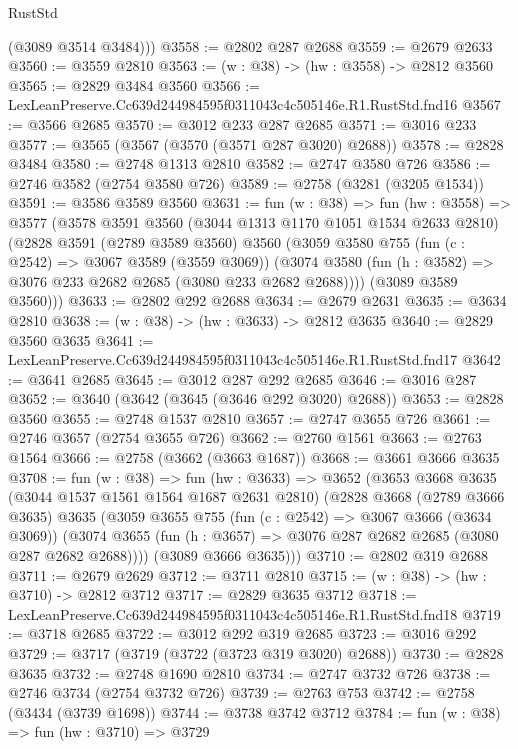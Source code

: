 \begin{lexlean}{RustStd}
\begin{coremodule}
        (@3089 @3514 @3484)))
@3558 := @2802 @287 @2688
@3559 := @2679 @2633
@3560 := @3559 @2810
@3563 := (w : @38) -> (hw : @3558) -> @2812 @3560
@3565 := @2829 @3484 @3560
@3566 := LexLeanPreserve.Cc639d244984595f0311043c4c505146e.R1.RustStd.fnd16
@3567 := @3566 @2685
@3570 := @3012 @233 @287 @2685
@3571 := @3016 @233
@3577 := @3565 (@3567 (@3570 (@3571 @287 @3020) @2688))
@3578 := @2828 @3484
@3580 := @2748 @1313 @2810
@3582 := @2747 @3580 @726
@3586 := @2746 @3582 (@2754 @3580 @726)
@3589 := @2758 (@3281 (@3205 @1534))
@3591 := @3586 @3589 @3560
@3631 := fun (w : @38) =>
  fun (hw : @3558) =>
  @3577
    (@3578
      @3591
      @3560
      (@3044 @1313 @1170 @1051 @1534 @2633 @2810)
      (@2828
        @3591
        (@2789 @3589 @3560)
        @3560
        (@3059
          @3580
          @755
          (fun (c : @2542) => @3067 @3589 (@3559 @3069))
          (@3074 @3580 (fun (h : @3582) => @3076 @233 @2682 @2685 (@3080 @233 @2682 @2688))))
        (@3089 @3589 @3560)))
@3633 := @2802 @292 @2688
@3634 := @2679 @2631
@3635 := @3634 @2810
@3638 := (w : @38) -> (hw : @3633) -> @2812 @3635
@3640 := @2829 @3560 @3635
@3641 := LexLeanPreserve.Cc639d244984595f0311043c4c505146e.R1.RustStd.fnd17
@3642 := @3641 @2685
@3645 := @3012 @287 @292 @2685
@3646 := @3016 @287
@3652 := @3640 (@3642 (@3645 (@3646 @292 @3020) @2688))
@3653 := @2828 @3560
@3655 := @2748 @1537 @2810
@3657 := @2747 @3655 @726
@3661 := @2746 @3657 (@2754 @3655 @726)
@3662 := @2760 @1561
@3663 := @2763 @1564
@3666 := @2758 (@3662 (@3663 @1687))
@3668 := @3661 @3666 @3635
@3708 := fun (w : @38) =>
  fun (hw : @3633) =>
  @3652
    (@3653
      @3668
      @3635
      (@3044 @1537 @1561 @1564 @1687 @2631 @2810)
      (@2828
        @3668
        (@2789 @3666 @3635)
        @3635
        (@3059
          @3655
          @755
          (fun (c : @2542) => @3067 @3666 (@3634 @3069))
          (@3074 @3655 (fun (h : @3657) => @3076 @287 @2682 @2685 (@3080 @287 @2682 @2688))))
        (@3089 @3666 @3635)))
@3710 := @2802 @319 @2688
@3711 := @2679 @2629
@3712 := @3711 @2810
@3715 := (w : @38) -> (hw : @3710) -> @2812 @3712
@3717 := @2829 @3635 @3712
@3718 := LexLeanPreserve.Cc639d244984595f0311043c4c505146e.R1.RustStd.fnd18
@3719 := @3718 @2685
@3722 := @3012 @292 @319 @2685
@3723 := @3016 @292
@3729 := @3717 (@3719 (@3722 (@3723 @319 @3020) @2688))
@3730 := @2828 @3635
@3732 := @2748 @1690 @2810
@3734 := @2747 @3732 @726
@3738 := @2746 @3734 (@2754 @3732 @726)
@3739 := @2763 @753
@3742 := @2758 (@3434 (@3739 @1698))
@3744 := @3738 @3742 @3712
@3784 := fun (w : @38) =>
  fun (hw : @3710) =>
  @3729

\end{coremodule}
\end{lexlean}
